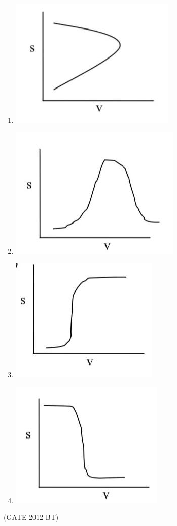 \documentclass[journal,12pt,onecolumn]{IEEEtran}
\theoremstyle{remark}
\begin{document}
\begin{enumerate}
\begin{multicols}{2}
\begin{enumerate}[label=\alph*)]
\item \includegraphics[width=0.4\columnwidth]{figures_3/fig_3.1.jpeg}
\item \includegraphics[width=0.4\columnwidth]{figures_3/fig_3.2.jpeg}
\item\includegraphics[width=0.4\columnwidth]{figures_3/fig_3.3.jpeg} 
\item \includegraphics[width=0.4\columnwidth]{figures_3/fig_3.4.jpeg}
\end{enumerate}
\end{multicols} \hfill(GATE 2012 BT)



\end{enumerate}
\end{document}
